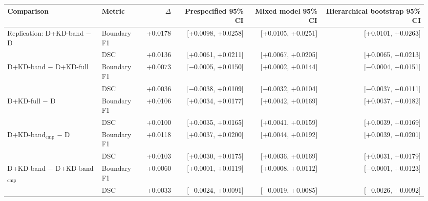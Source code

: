 \begin{tabular}{@{}llrrrr@{}}
\toprule
Comparison & Metric & $\Delta$ & Prespecified 95\% CI & Mixed model 95\% CI & Hierarchical bootstrap 95\% CI \\
\midrule
Replication: D+KD-band $-$ D & Boundary F1 & +0.0178 & [+0.0098, +0.0258] & [+0.0105, +0.0251] & [+0.0101, +0.0263] \\
 & DSC & +0.0136 & [+0.0061, +0.0211] & [+0.0067, +0.0205] & [+0.0065, +0.0213] \\
D+KD-band $-$ D+KD-full & Boundary F1 & +0.0073 & [$-$0.0005, +0.0150] & [+0.0002, +0.0144] & [$-$0.0004, +0.0151] \\
 & DSC & +0.0036 & [$-$0.0038, +0.0109] & [$-$0.0032, +0.0104] & [$-$0.0037, +0.0111] \\
D+KD-full $-$ D & Boundary F1 & +0.0106 & [+0.0034, +0.0177] & [+0.0042, +0.0169] & [+0.0037, +0.0182] \\
 & DSC & +0.0100 & [+0.0035, +0.0165] & [+0.0041, +0.0159] & [+0.0039, +0.0169] \\
D+KD-band$_{\mathrm{cmp}}$ $-$ D & Boundary F1 & +0.0118 & [+0.0037, +0.0200] & [+0.0044, +0.0192] & [+0.0039, +0.0201] \\
 & DSC & +0.0103 & [+0.0030, +0.0175] & [+0.0036, +0.0169] & [+0.0031, +0.0179] \\
D+KD-band $-$ D+KD-band$_{\mathrm{cmp}}$ & Boundary F1 & +0.0060 & [+0.0001, +0.0119] & [+0.0008, +0.0112] & [$-$0.0001, +0.0123] \\
 & DSC & +0.0033 & [$-$0.0024, +0.0091] & [$-$0.0019, +0.0085] & [$-$0.0026, +0.0092] \\
\bottomrule
\end{tabular}
